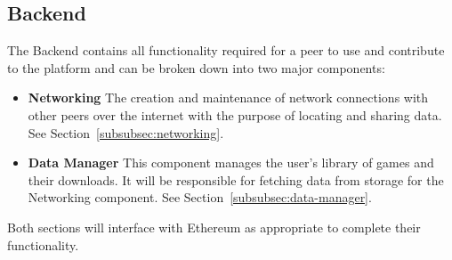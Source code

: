 \subsection{Backend}\label{subsec:backend}

The Backend contains all functionality required for a peer to use and contribute to the platform and can be broken down into two major components:

\begin{itemize}
  \item \textbf{Networking} The creation and maintenance of network connections with other peers over the internet with the purpose of locating and sharing data. See Section~\ref{subsubsec:networking}.
  \item \textbf{Data Manager} This component manages the user's library of games and their downloads. It will be responsible for fetching data from storage for the Networking component. See Section~\ref{subsubsec:data-manager}.
\end{itemize}

\newparagraph
Both sections will interface with Ethereum as appropriate to complete their functionality. 



